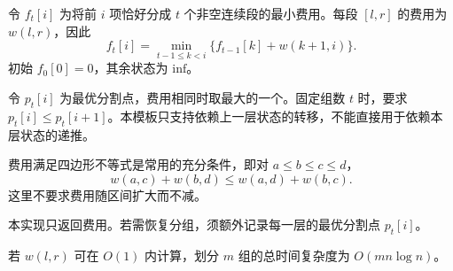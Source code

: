 令 $f_t[i]$ 为将前 $i$ 项恰好分成 $t$ 个非空连续段的最小费用。每段 $[l,r]$ 的费用为 $w(l,r)$，因此
\[
f_t[i]=\min_{t-1\le k<i}\{f_{t-1}[k]+w(k+1,i)\}.
\]
初始 $f_0[0]=0$，其余状态为 $\mathrm{inf}$。

令 $p_t[i]$ 为最优分割点，费用相同时取最大的一个。固定组数 $t$ 时，要求 $p_t[i]\le p_t[i+1]$。本模板只支持依赖上一层状态的转移，不能直接用于依赖本层状态的递推。

费用满足四边形不等式是常用的充分条件，即对 $a\le b\le c\le d$，
\[
w(a,c)+w(b,d)\le w(a,d)+w(b,c).
\]
这里不要求费用随区间扩大而不减。

本实现只返回费用。若需恢复分组，须额外记录每一层的最优分割点 $p_t[i]$。

若 $w(l,r)$ 可在 $O(1)$ 内计算，划分 $m$ 组的总时间复杂度为 $O(mn\log n)$。
